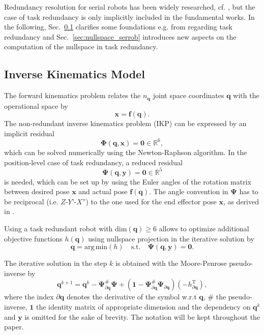 \documentclass[a4paper,twoside]{article}
\newcommand{\transp}[0]{{\mathrm{T}}}
\begin{document}
Redundancy resolution for serial robots has been widely researched, cf. \cite{ChiaveriniOriWal2008}, but the case of task redundancy is only implicitly included in the fundamental works.
%
In the following, Sec.~\ref{sec:ikp_serrob} clarifies some foundations e.g. from \cite{ChiaveriniOriWal2008} regarding task redundancy and Sec.~\ref{sec:nullspace_serrob} introduces new aspects on the computation of the nullspace in task redundancy.

\subsection{Inverse Kinematics Model}
\label{sec:ikp_serrob}


The forward kinematics problem relates the $n_{\bm{q}}$ joint space coordinates $\bm{q}$ with the operational space by
\begin{equation}
\bm{x}=\bm{f}(\bm{q}).
\label{eq:ser_fkin}
\end{equation}
The non-redundant inverse kinematics problem (IKP) can be expressed by an implicit residual
\begin{equation}
\bm{\Phi}(\bm{q},\bm{x})=\bm{0} \in \mathbb{R}^6,
\label{eq:ser_residual_full}
\end{equation}
which can be solved numerically using the Newton-Raphson algorithm.
In the position-level case of task redundancy, a reduced residual 
\begin{equation}
\bm{\Psi}(\bm{q},\bm{y})=\bm{0} \in \mathbb{R}^5
\label{eq:ser_residual_red}
\end{equation}
is needed, which can be set up by using the Euler angles of the rotation matrix between desired pose $\bm{x}$ and actual pose $\bm{f}(\bm{q})$.
The angle convention in $\bm{\Psi}$ has to be reciprocal (i.e. $Z$-$Y$'-$X$'') to the one used for the end effector pose $\bm{x}$, as derived in \cite{SchapplerTapOrt2019}.

Using a task redundant robot with $\mathrm{dim}(\bm{q}) \geq 6$ allows to optimize additional objective functions $h(\bm{q})$ using nullspace projection in the iterative solution by
\begin{equation}
\bm{q}=\mathrm{arg\,min}(h)\quad\mathrm{s.t.}\quad \bm{\Psi}(\bm{q},\bm{y})=\bm{0}.
\end{equation}

The iterative solution in the step $k$ is obtained with the Moore-Penrose pseudo-inverse by
\begin{equation}
\bm{q}^{k+1}=\bm{q}^{k} - 
\bm{\Psi}_{\partial \bm{q}}^{\#}\bm{\Psi}+(\bm{1}-\bm{\Psi}_{\partial \bm{q}}^{\#}\bm{\Psi}_{\partial \bm{q}}) (-h_{\partial \bm{q}}^\transp),
\label{eq:ser_position_ik}
\end{equation}
where the index $\partial \bm{q}$ denotes the derivative of the symbol w.r.t $\bm{q}$, \# the pseudo-inverse, $\bm{1}$ the identity matrix of appropriate dimension and the dependency on $\bm{q}^{k}$ and $\bm{y}$ is omitted for the sake of brevity.
The notation will be kept throughout the paper.
\end{document}
